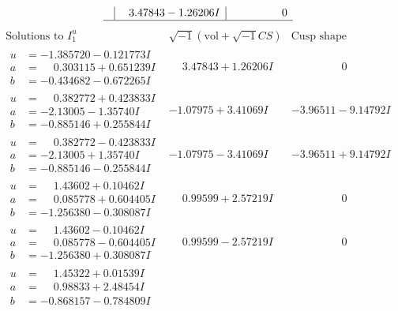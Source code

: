 \documentclass[1p]{elsarticle_modified}
\theoremstyle{definition}
\newcommand{\I}{\sqrt{-1}}
\begin{document}
$$\begin{array}{c|c|c}
 & \phantom{-}3.47843 - 1.26206 I & \phantom{-0.000000 } 0\\
 \hline 
 \end{array}$$\newpage$$\begin{array}{c|c|c}  
\text{Solutions to }I^u_{1}& \I (\text{vol} + \sqrt{-1}CS) & \text{Cusp shape}\\
 \hline 
\begin{aligned}
u &= -1.385720 - 0.121773 I \\
a &= \phantom{-}0.303115 + 0.651239 I \\
b &= -0.434682 - 0.672265 I\end{aligned}
 & \phantom{-}3.47843 + 1.26206 I & \phantom{-0.000000 } 0 \\ \hline\begin{aligned}
u &= \phantom{-}0.382772 + 0.423833 I \\
a &= -2.13005 - 1.35740 I \\
b &= -0.885146 + 0.255844 I\end{aligned}
 & -1.07975 + 3.41069 I & -3.96511 - 9.14792 I \\ \hline\begin{aligned}
u &= \phantom{-}0.382772 - 0.423833 I \\
a &= -2.13005 + 1.35740 I \\
b &= -0.885146 - 0.255844 I\end{aligned}
 & -1.07975 - 3.41069 I & -3.96511 + 9.14792 I \\ \hline\begin{aligned}
u &= \phantom{-}1.43602 + 0.10462 I \\
a &= \phantom{-}0.085778 + 0.604405 I \\
b &= -1.256380 - 0.308087 I\end{aligned}
 & \phantom{-}0.99599 + 2.57219 I & \phantom{-0.000000 } 0 \\ \hline\begin{aligned}
u &= \phantom{-}1.43602 - 0.10462 I \\
a &= \phantom{-}0.085778 - 0.604405 I \\
b &= -1.256380 + 0.308087 I\end{aligned}
 & \phantom{-}0.99599 - 2.57219 I & \phantom{-0.000000 } 0 \\ \hline\begin{aligned}
u &= \phantom{-}1.45322 + 0.01539 I \\
a &= \phantom{-}0.98833 + 2.48454 I \\
b &= -0.868157 - 0.784809 I\end{aligned}

\end{array}$$
\end{document}
